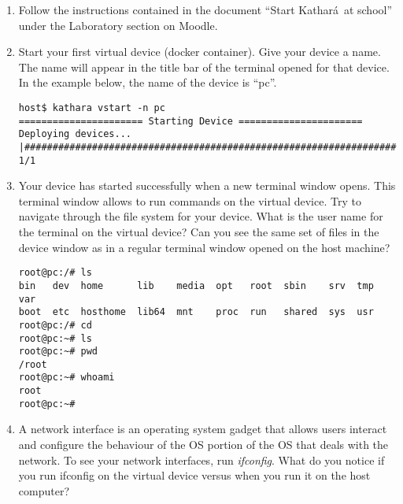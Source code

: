 \documentclass[12pt]{book}
\newcommand{\kathara}{Kathar\'a}
\begin{document}
\begin{enumerate}[{Activity }1)]
    

\item Follow the instructions contained in the document ``Start \kathara\ at school'' under the Laboratory section on Moodle.
  
\item Start your first virtual device (docker container). Give your device a name. The name will appear in the title bar of the terminal opened for that device. In the example below, the name of the device is ``pc''.

  \begin{verbatim}
host$ kathara vstart -n pc
====================== Starting Device ======================
Deploying devices... |##################################################################| 1/1
\end{verbatim}

\item Your device has started successfully when a new terminal window opens. This terminal window allows to run commands on the virtual device. Try to navigate through the file system for your device. What is the user name for the terminal on the virtual device? Can you see the same set of files in the device window as in a regular terminal window opened on the host machine?

\begin{verbatim}
root@pc:/# ls
bin   dev  home      lib    media  opt   root  sbin    srv  tmp  var
boot  etc  hosthome  lib64  mnt    proc  run   shared  sys  usr
root@pc:/# cd 
root@pc:~# ls
root@pc:~# pwd
/root
root@pc:~# whoami
root
root@pc:~# 
\end{verbatim}

\item A network interface is an operating system gadget that allows users interact and configure the behaviour of the OS portion of the OS that deals with the network. To see your network interfaces, run \emph{ifconfig}. What do you notice if you run ifconfig on the virtual device versus when you run it on the host computer?


\end{enumerate}
\end{document}
